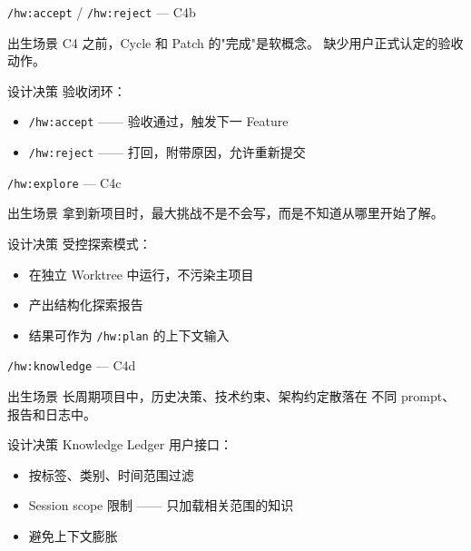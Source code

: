 \documentclass[theme=workflow,aspectratio=169,fontset=tech]{Hypo-Slide}
\begin{document}
\begin{frame}{\texttt{/hw:accept} / \texttt{/hw:reject} — C4b}
  \begin{block}{出生场景}
    C4 之前，Cycle 和 Patch 的"完成"是软概念。
    缺少用户正式认定的验收动作。
  \end{block}
  \begin{block}{设计决策}
    验收闭环：
    \begin{itemize}
      \item \texttt{/hw:accept} —— 验收通过，触发下一 Feature
      \item \texttt{/hw:reject} —— 打回，附带原因，允许重新提交
    \end{itemize}
  \end{block}
\end{frame}

\begin{frame}{\texttt{/hw:explore} — C4c}
  \begin{block}{出生场景}
    拿到新项目时，最大挑战不是不会写，而是不知道从哪里开始了解。
  \end{block}
  \begin{block}{设计决策}
    受控探索模式：
    \begin{itemize}
      \item 在独立 Worktree 中运行，不污染主项目
      \item 产出结构化探索报告
      \item 结果可作为 \texttt{/hw:plan} 的上下文输入
    \end{itemize}
  \end{block}
\end{frame}

\begin{frame}{\texttt{/hw:knowledge} — C4d}
  \begin{block}{出生场景}
    长周期项目中，历史决策、技术约束、架构约定散落在
    不同 prompt、报告和日志中。
  \end{block}
  \begin{block}{设计决策}
    Knowledge Ledger 用户接口：
    \begin{itemize}
      \item 按标签、类别、时间范围过滤
      \item Session scope 限制 —— 只加载相关范围的知识
      \item 避免上下文膨胀
    \end{itemize}
  \end{block}
\end{frame}
\end{document}
